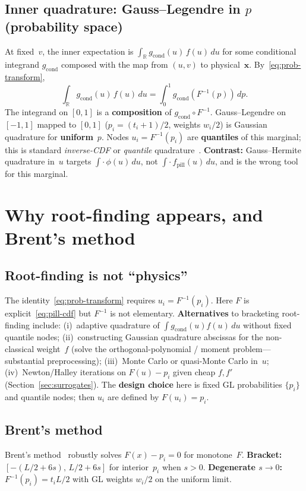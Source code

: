 \documentclass[11pt,a4paper]{article}
\begin{document}
\subsection{Inner quadrature: Gauss--Legendre in \texorpdfstring{$p$}{p} (probability space)}
\label{sec:pill}
At fixed~$v$, the inner expectation is $\int_{\mathbb{R}} g_{\mathrm{cond}}(u)\,f(u)\,du$ for some conditional integrand $g_{\mathrm{cond}}$ composed with the map from $(u,v)$ to physical~$\mathbf{x}$.
By~\eqref{eq:prob-transform},
\[
  \int_{\mathbb{R}} g_{\mathrm{cond}}(u)\,f(u)\,du = \int_0^1 g_{\mathrm{cond}}(F^{-1}(p))\,dp.
\]
The integrand on $[0,1]$ is a \textbf{composition} of $g_{\mathrm{cond}}\circ F^{-1}$.
Gauss--Legendre on $[-1,1]$ mapped to $[0,1]$ ($p_i=(t_i+1)/2$, weights $w_i/2$) is Gaussian quadrature for \textbf{uniform}~$p$.
Nodes $u_i=F^{-1}(p_i)$ are \textbf{quantiles} of this marginal; this is standard \emph{inverse-CDF} or \emph{quantile} quadrature~\cite{gautschi}.
\textbf{Contrast:} Gauss--Hermite quadrature in~$u$ targets $\int \cdot\,\phi(u)\,du$, not $\int \cdot\,f_{\mathrm{pill}}(u)\,du$, and is the wrong tool for this marginal.

\section{Why root-finding appears, and Brent's method}
\label{sec:brent}

\subsection{Root-finding is not ``physics''}
The identity~\eqref{eq:prob-transform} requires $u_i=F^{-1}(p_i)$.
Here $F$ is explicit~\eqref{eq:pill-cdf} but $F^{-1}$ is not elementary.
\textbf{Alternatives} to bracketing root-finding include:
(i)~adaptive quadrature of $\int g_{\mathrm{cond}}(u)f(u)\,du$ without fixed quantile nodes;
(ii)~constructing Gaussian quadrature abscissas for the non-classical weight~$f$ (solve the orthogonal-polynomial / moment problem---substantial preprocessing);
(iii)~Monte Carlo or quasi-Monte Carlo in~$u$;
(iv)~Newton/Halley iterations on $F(u)-p_i$ given cheap $f,f'$ (Section~\ref{sec:surrogates}).
The \textbf{design choice} here is fixed GL probabilities $\{p_i\}$ and quantile nodes; then $u_i$ are defined by $F(u_i)=p_i$.

\subsection{Brent's method}
Brent's method~\cite{brent1973} robustly solves $F(x)-p_i=0$ for monotone~$F$.
\textbf{Bracket:} $[-(L/2+6s),\,L/2+6s]$ for interior~$p_i$ when $s>0$.
\textbf{Degenerate $s\to 0$:} $F^{-1}(p_i)=t_i L/2$ with GL weights $w_i/2$ on the uniform limit.
\end{document}
